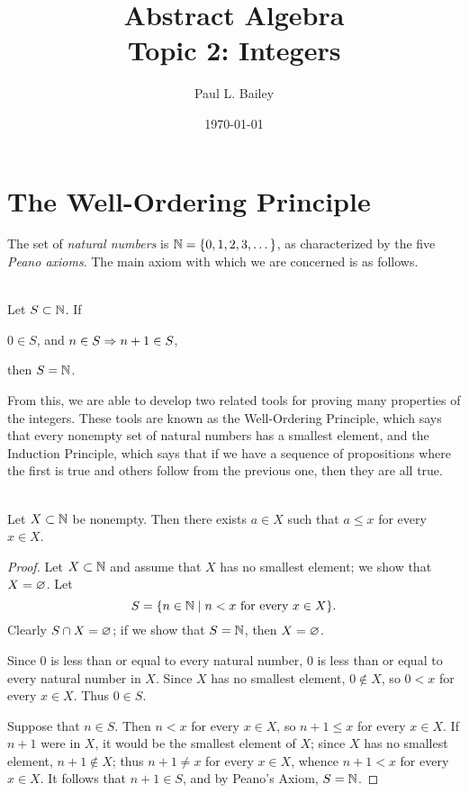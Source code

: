 \documentclass{amsart}
\begin{document}
\title{Abstract Algebra \\ Topic 2: Integers}
\author[P. L. Bailey]{Paul L. Bailey}
\address{Department of Mathematics and CSci\\
         Southern Arkansas University}
\date{\today}

\maketitle

\section{The Well-Ordering Principle}

The set of {\em natural numbers} is $\mathbb{N} = \{ 0,1,2,3,\dots\}$,
as characterized by the five {\em Peano axioms}.  The main axiom
with which we are concerned is as follows.

\begin{Prop}  \\
Let $S \subset \mathbb{N}$. If
\begin{itemize}
 $0 \in S$, and  $n \in S \Rightarrow n+1 \in S$,
\end{itemize}
then $S = \mathbb{N}$.
\end{Prop}

From this, we are able to develop two related tools for proving
many properties of the integers.  These tools are known as the Well-Ordering Principle,
which says that every nonempty set of natural numbers has a smallest element,
and the Induction Principle, which says that if we have a sequence of propositions
where the first is true and others follow from the previous one,
then they are all true.

\begin{Prop}
 \\
Let $X \subset \mathbb{N}$ be nonempty. Then there exists $a \in X$ such
that $a \le x$ for every $x \in X$.
\end{Prop}

\begin{proof}
Let $X \subset \mathbb{N}$ and assume that $X$ has no smallest element;
we show that $X = \varnothing$. Let
\[ S = \{ n \in \mathbb{N} \mid n < x \text{ for every } x \in X \} . \]
Clearly $S \cap X = \varnothing$; if we show that $S = \mathbb{N}$, then $X =
\varnothing$.

Since $0$ is less than or equal to every natural number, $0$ is
less than or equal to every natural number in $X$.  Since $X$ has
no smallest element, $0 \notin X$, so $0 < x$ for every $x \in X$.
Thus $0 \in S$.

Suppose that $n \in S$. Then $n < x$ for every $x \in X$, so $n+1
\le x$ for every $x \in X$. If $n+1$ were in $X$, it would be the
smallest element of $X$; since $X$ has no smallest element, $n+1
\notin X$; thus $n+1 \ne x$ for every $x \in X$, whence $n+1 < x$
for every $x \in X$. It follows that $n+1 \in S$, and by Peano's
Axiom, $S = \mathbb{N}$.
\end{proof}
\end{document}
